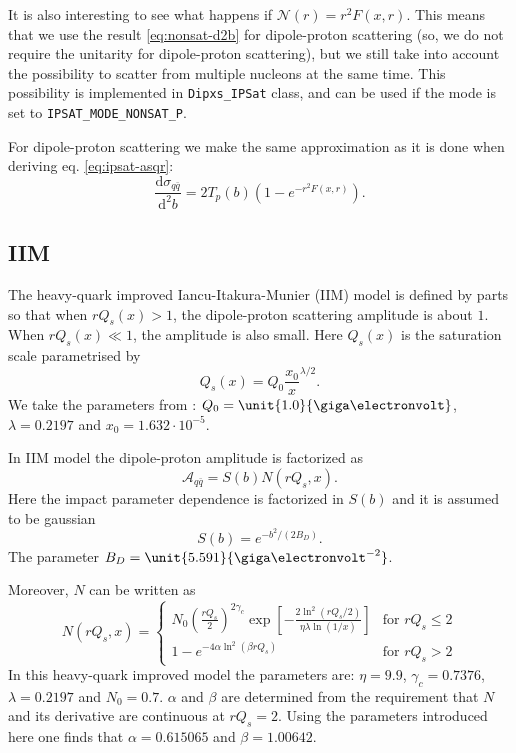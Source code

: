 \documentclass[a4paper,12pt]{article}
\newcommand{\code}[1]{\texttt{#1}}
\newcommand{\der}{\mathrm{d}}
\newcommand{\A}{\mathcal{A}}
\newcommand{\N}{\mathcal{N}}
\begin{document}
It is also interesting to see what happens if $\N(r)=r^2F(x,r)$. This means that we use the result \eqref{eq:nonsat-d2b} for dipole-proton scattering (so, we do not require the unitarity for dipole-proton scattering), but we still take into account the possibility to scatter from multiple nucleons at the same time. This possibility is implemented in \code{Dipxs\_IPSat} class, and can be used if the mode is set to \code{IPSAT\_MODE\_NONSAT\_P}.

For dipole-proton scattering we make the same approximation as it is done when deriving eq. \eqref{eq:ipsat-asqr}:
\begin{equation}
	\frac{\der \sigma_{q\bar q}}{\der^2 b} = 2 T_p(b)\left( 1-e^{-r^2F(x,r) } \right).
\end{equation}

\subsection{IIM}
The heavy-quark improved Iancu-Itakura-Munier (IIM) model is defined by parts so that when $rQ_s(x)>1$, the dipole-proton scattering amplitude is about $1$. When $rQ_s(x) \ll 1$, the amplitude is also small. Here $Q_s(x)$ is the saturation scale parametrised by
\begin{equation}
	Q_s(x) = Q_0 \frac{x_0}{x}^{\lambda/2}.
\end{equation}
We take the parameters from \cite{Marquet:2007nf}: $Q_0 = \unit{1.0}{\giga\electronvolt}$, $\lambda = 0.2197$ and $x_0 = 1.632 \cdot 10^{-5}$.

In IIM model the dipole-proton amplitude is factorized as
\begin{equation}
	\label{eq:iim-a}
	\A_{q\bar q} = S(b) N(rQ_s,x).
\end{equation}
Here the impact parameter dependence is factorized in $S(b)$ and it is assumed to be gaussian
\begin{equation}
	S(b) = e^{-b^2/(2B_D)}.
\end{equation}
The parameter $B_D = \unit{5.591}{\giga\electronvolt^{-2}}$.

Moreover, $N$ can be written as
\begin{equation}
N(rQ_s,x) = \begin{cases}
	N_0\left( \frac{rQ_s}{2} \right)^{2\gamma_c} \exp \left[ -\frac{2 \ln^2 (rQ_s/2) }{\eta \lambda \ln (1/x)} \right] & \text{for } rQ_s \leq 2  \\
	1-e^{-4\alpha \ln^2 (\beta rQ_s)} & \text{for } rQ_s > 2	
	\end{cases}
\end{equation}
In this heavy-quark improved model the parameters are: $\eta = 9.9$, $\gamma_c = 0.7376$, $\lambda=0.2197$ and $N_0 = 0.7$. $\alpha$ and $\beta$ are determined from the requirement that $N$ and its derivative are continuous at $rQ_s=2$. Using the parameters introduced here one finds that $\alpha = 0.615065$ and $\beta = 1.00642$.
\end{document}
